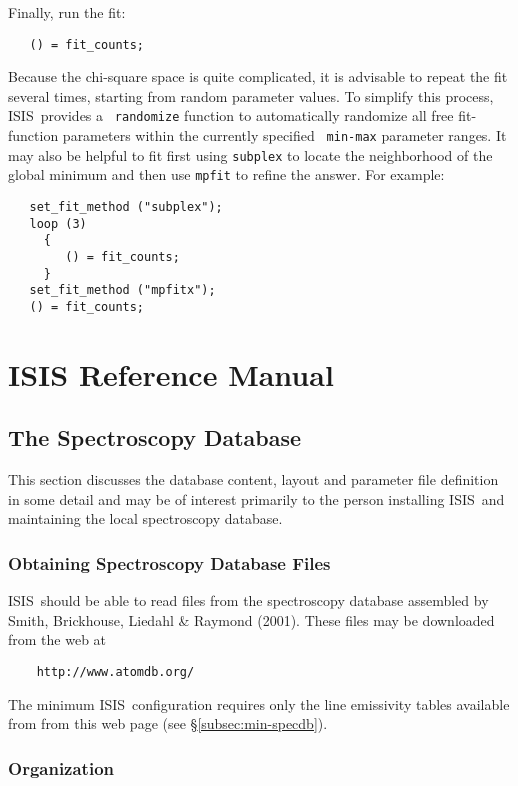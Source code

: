 \documentclass{book}
\newcommand{\isisx}{{\sc ISIS~}}
\begin{document}
Finally, run the fit:
\begin{verbatim}
   () = fit_counts;
\end{verbatim}

Because the chi-square space is quite complicated, it is advisable
to repeat the fit several times, starting from random parameter
values.  To simplify this process, \isisx provides a {\tt
randomize} function to automatically randomize all free
fit-function parameters within the currently specified {\tt
min-max} parameter ranges. It may also be helpful to fit first
using {\tt subplex} to locate the neighborhood of the global
minimum and then use {\tt mpfit} to refine the answer.  For
example:

\begin{verbatim}
   set_fit_method ("subplex");
   loop (3)
     {
        () = fit_counts;
     }
   set_fit_method ("mpfitx");
   () = fit_counts;
\end{verbatim}

\part{ISIS Reference Manual \label{part:refman}}

\chapter{The Spectroscopy Database}
\label{chap:specdb}

This section discusses the database content, layout and parameter file
definition in some detail and may be of interest primarily to the person
installing \isisx and maintaining the local spectroscopy database.

\section{Obtaining Spectroscopy Database Files}

\isisx should be able to read files from the spectroscopy database assembled
by Smith, Brickhouse, Liedahl \& Raymond (2001).  These files may be
downloaded from the web at
\begin{verbatim}
    http://www.atomdb.org/
\end{verbatim}
The minimum \isisx configuration requires only the line emissivity tables
available from from this web page (see \S \ref{subsec:min-specdb}).

\section{Organization}
\end{document}
